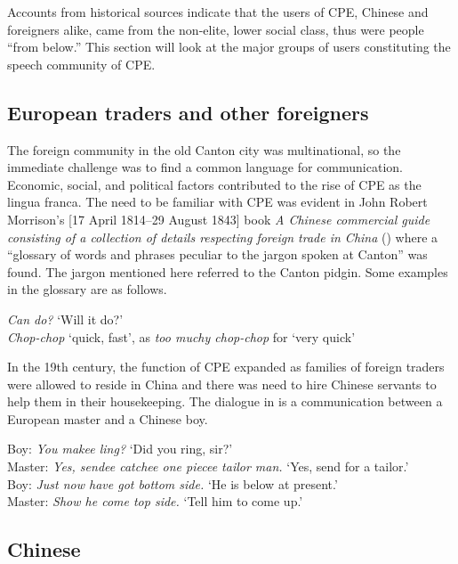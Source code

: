 \documentclass[output=paper]{langsci/langscibook}
\begin{document}
Accounts from historical sources indicate that the users of CPE, Chinese and foreigners alike, came from the non-elite, lower social class, thus were people “from below.” This section will look at the major groups of users constituting the speech community of CPE. 

\subsection{European traders and other foreigners}\label{sec:7:4.1}

The foreign community in the old Canton city was multinational, so the immediate challenge was to find a common language for communication. Economic, social, and political factors contributed to the rise of CPE as the lingua franca. The need to be familiar with CPE was evident in John Robert Morrison’s [17 April 1814--29 August 1843] book \textit{A Chinese commercial guide consisting of a collection of details respecting foreign trade in China} (\citeyear{morrison_chinese_1834}) where a “glossary of words and phrases peculiar to the jargon spoken at Canton” was found. The jargon mentioned here referred to the Canton pidgin. Some examples in the glossary are as follows.

\ea 
    \label{ex:7:1}
    \textit{Can do?} ‘Will it do?’\\
    \textit{Chop-chop} ‘quick, fast’, as \textit{too muchy chop-chop} for ‘very quick’
\z

In the 19th century, the function of CPE expanded as families of foreign traders were allowed to reside in China and there was need to hire Chinese servants to help them in their housekeeping. The dialogue in  is a communication between a European master and a Chinese boy. 

\ea \label{ex:7:2}
Boy: \textit{You makee ling?} ‘Did you ring, sir?’\\
Master: \textit{Yes, sendee catchee one piecee tailor man.} ‘Yes, send for a tailor.’\\
Boy: \textit{Just now have got bottom side.} ‘He is below at present.’\\
Master: \textit{Show he come top side.} ‘Tell him to come up.’\\

\citep[43]{anonymous_englishman_1860}
\z

\subsection{Chinese}\label{sec:7:4.2}
\end{document}

